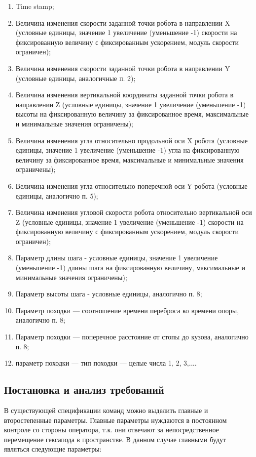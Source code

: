 \begin{enumerate}
	\item Time stamp;
	\item Величина изменения скорости заданной точки робота в направлении X (условные единицы, значение 1 увеличение (уменьшение -1) скорости на фиксированную величину с фиксированным ускорением, модуль скорости ограничен);
	\item Величина изменения скорости заданной точки робота в направлении Y (условные единицы, аналогичные п. 2);
	\item Величина изменения вертикальной координаты заданной точки робота в направлении Z (условные единицы, значение 1 увеличение (уменьшение -1) высоты на фиксированную величину за фиксированное время, максимальные и минимальные значения ограничены);
	\item Величина изменения угла относительно продольной оси X робота (условные единицы, значение 1 увеличение (уменьшение -1) угла на фиксированную величину за фиксированное время, максимальные и минимальные значения ограничены);
	\item Величина изменения угла относительно поперечной оси Y робота (условные единицы, аналогично п. 5);
	\item Величина изменения угловой скорости робота относительно вертикальной оси Z (условные единицы, значение 1 увеличение (уменьшение -1) скорости на фиксированную величину с фиксированным ускорением, модуль скорости ограничен);
	\item Параметр длины шага - условные единицы, значение 1 увеличение (уменьшение -1) длины шага на фиксированную величину, максимальные и минимальные значения ограничены);
	\item Параметр высоты шага - условные единицы, аналогично п. 8;
	\item Параметр походки — соотношение времени переброса ко времени опоры, аналогично п. 8;
	\item Параметр походки — поперечное расстояние от стопы до кузова, аналогично п. 8;
	\item параметр походки — тип походки — целые числа 1, 2, 3,....
\end{enumerate}

\subsection{Постановка и анализ требований}

В существующей спецификации команд можно выделить главные и второстепенные параметры. Главные параметры нуждаются в постоянном контроле со стороны оператора, т.к. они отвечают за непосредственное перемещение гексапода в пространстве. В данном случае главными будут являться следующие параметры:

